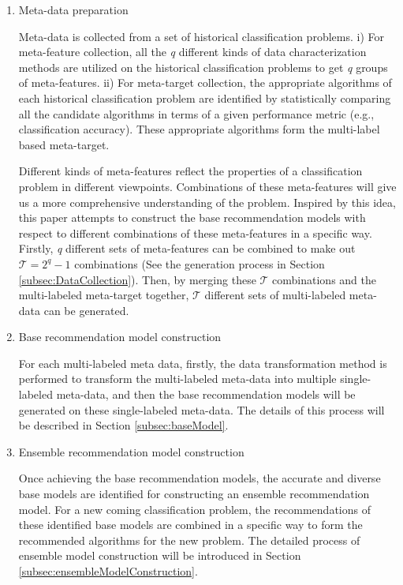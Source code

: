 \documentclass[acmsmall]{acmart}
\begin{document}
\begin{enumerate}[1)]
	\item Meta-data preparation
	
	Meta-data is collected from a set of historical classification problems.
	i) For meta-feature collection, all the \emph{q} different kinds of data
	characterization methods are utilized on the historical classification problems to get \emph{q} groups of
	meta-features. ii) For meta-target collection, the
	appropriate algorithms of each historical classification problem are identified
	by statistically comparing all the candidate
	algorithms in terms of a given performance metric (e.g., classification accuracy).
	These appropriate algorithms form the multi-label based meta-target.
	
	\quad  Different kinds of meta-features reflect the properties of a
	classification problem in different viewpoints. Combinations of these
	meta-features will give us a more comprehensive understanding
	of the problem. Inspired by this idea, this paper attempts to
	construct the base recommendation models with respect to
	different combinations of these meta-features in a specific way. Firstly, \emph{q} different
	sets of meta-features can be combined to make out $\mathcal{T} = 2^q - 1$
	combinations (See the generation process in Section \ref{subsec:DataCollection}). Then, by merging these $\mathcal{T}$ combinations and
	the multi-labeled meta-target together, $\mathcal{T}$ different sets of multi-labeled meta-data can be
	generated.
	
	\item Base recommendation model construction
	
	For each multi-labeled meta data, firstly, the data transformation
	method is performed to transform the multi-labeled
	meta-data into multiple single-labeled meta-data, and then the
	base recommendation models will be generated on these
	single-labeled meta-data. The details of this process will be described in Section
	\ref{subsec:baseModel}.
	
	\item Ensemble recommendation model construction
	
	Once achieving the base recommendation models, the accurate and
	diverse base models are identified for constructing an ensemble
	recommendation model.
	For a new coming classification problem, the recommendations of
	these identified base models are combined in a specific way to form the
	recommended algorithms for the new problem. The detailed
	process of ensemble model construction will be introduced in
	Section \ref{subsec:ensembleModelConstruction}.
\end{enumerate}
\end{document}
